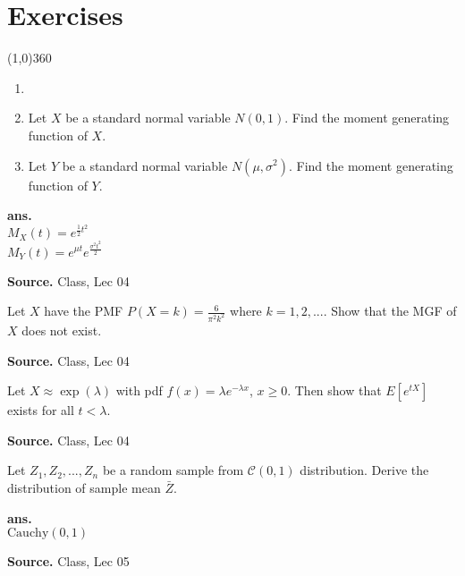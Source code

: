 \documentclass[12pt,twoside]{report}
\newenvironment*{ans}{\textbf{ans.}\space\em\\}{\par}
\newenvironment*{source}{\hfill\scriptsize\textbf{Source.}\space}{\par}
\begin{document}
\newpage
\chapter{Exercises}
\line(1,0){360} \\


\begin{samepage}
\begin{ex}
    \begin{enumerate}[label=(\roman*)]
        \item[]
        \item Let $X$ be a standard normal variable $N(0,1)$. Find the moment generating function of $X$.
        \item Let $Y$ be a standard normal variable $N(\mu,\sigma ^2)$. Find the moment generating function of $Y$.
    \end{enumerate}
\end{ex}
\begin{ans}
$M_X(t) = e^{\frac{1}{2} t^2}$ \\
$M_Y(t) = e^{\mu t} e^{\frac{\sigma^2 t^2}{2}}$ 
\end{ans}
\begin{source}
Class, Lec 04
\end{source}
\end{samepage}

\begin{samepage}
\begin{ex}
Let $X$ have the PMF $P(X = k) = \frac{6}{\pi ^2 k^2}$ where $k = 1,2, ...$.
Show that the MGF of $X$ does not exist.
\end{ex}
\begin{source}
Class, Lec 04
\end{source}
\end{samepage}

\begin{samepage}
\begin{ex}
Let $X \approx \exp(\lambda)$ with pdf $f(x) = \lambda e^{- \lambda x}$, $x \geq 0$. Then show that $E[e^{tX}]$ exists for all $t < \lambda$.
\end{ex}
\begin{source}
Class, Lec 04
\end{source}
\end{samepage}

\begin{samepage}
\begin{ex}
Let $Z_1, Z_2, ..., Z_n$ be a random sample from $\mathcal{C}(0,1)$ distribution. Derive the distribution of sample mean $\bar{Z}$.
\end{ex}
\begin{ans}
$\text{Cauchy}(0,1)$
\end{ans}
\begin{source}
Class, Lec 05
\end{source}
\end{samepage}
\end{document}

